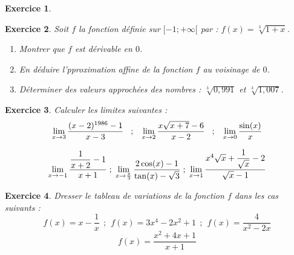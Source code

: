 \documentclass[12pt,a4paper]{article}
\newcommand{\Lim}{\displaystyle\lim}
\theoremstyle{mystyle}
\newtheorem{exo}{Exercice}
\begin{document}
\begin{multicols*}{2}
\begin{exo}
\begin{enumerate}
\end{enumerate}
\end{exo}

\begin{exo}
Soit $f$ la fonction définie sur $[-1;+\infty[$ par : $f(x) = \sqrt[3]{1+x}$.
\begin{enumerate}
	\item Montrer que $f$ est dérivable en $0$.
	\item En déduire l'pproximation affine de la fonction $f$ au voisinage de $0$.
	\item Déterminer des valeurs approchées des nombres : $\sqrt[3]{0,991}$ et $\sqrt[3]{1,007}$.
\end{enumerate}


\end{exo}

\begin{exo}
Calculer les limites suivantes :
$$\Lim_{x\to 3}\dfrac{(x-2)^{1986} - 1}{x - 3} \hspace{3mm} ; \hspace{3mm} \Lim_{x\to 2}\dfrac{x\sqrt{x+7} - 6}{x - 2} \hspace{3mm} ; \hspace{3mm} \Lim_{x\to 0}\dfrac{\sin(x)}{x}$$ 

$$\Lim_{x\to -1}\dfrac{\dfrac{1}{x+2} - 1}{x + 1} \hspace{1mm} ; \hspace{1mm} \Lim_{x\to \frac{\pi}{3}}\dfrac{2\cos(x) - 1}{\tan(x) - \sqrt{3}} \hspace{1mm} ; \hspace{1mm} \Lim_{x\to 1}\dfrac{x^4\sqrt{x} + \dfrac{1}{\sqrt{x}} - 2}{\sqrt{x} - 1}$$
\end{exo}

\begin{exo}

Dresser le tableau de variations de la fonction $f$ dans les cas suivants :
$$f(x) = x - \dfrac{1}{x} \ \ ; \ \ f(x) = 3x^4 - 2x^2 + 1 \ \ ; \ \ f(x) = \dfrac{4}{x^2 - 2x}$$
$$f(x) = \dfrac{x^2 + 4x + 1}{x + 1}$$
\end{exo}


\end{multicols*}
\end{document}
